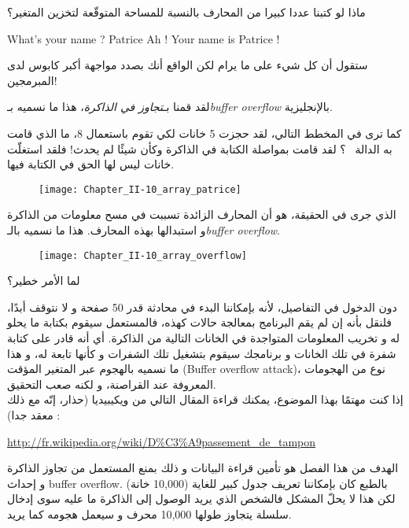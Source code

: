 ماذا لو كتبنا عددا كبيرا من المحارف بالنسبة للمساحة المتوقّعة لتخزين المتغير؟

\begin{Console}
What's your name ? Patrice
Ah ! Your name is Patrice !
\end{Console}

ستقول أن كل شيء على ما يرام لكن الواقع أنك بصدد مواجهة أكبر كابوس لدى المبرمجين!

لقد قمنا بـ\emph{تجاوز في الذاكرة}،
 هذا ما نسميه بـ\emph{\textenglish{buffer overflow}}
بالإنجليزية.

كما ترى في المخطط التالي، لقد حجزت 5 خانات لكي تقوم باستعمال 8، ما الذي قامت به الدالة
~؟
 لقد قامت بمواصلة الكتابة في الذاكرة وكأن شيئًا لم يحدث! فلقد استغلّت خانات ليس لها الحق في الكتابة فيها.

\begin{figure}[H]
	\centering
	\texttt{[image: Chapter\_II-10\_array\_patrice]}
\end{figure}

الذي جرى في الحقيقة، هو أن المحارف الزائدة تسببت في مسح معلومات من الذاكرة و استبدالها بهذه المحارف. هذا ما نسميه بالـ\emph{\textenglish{buffer overflow}}.

\begin{figure}[H]
	\centering
	\texttt{[image: Chapter\_II-10\_array\_overflow]}
\end{figure}

\begin{question}
  لما الأمر خطير؟
\end{question}

دون الدخول في التفاصيل، لأنه بإمكاننا البدء في محادثة  قدر 50 صفحة و لا نتوقف أبدًا، فلنقل بأنه إن لم يقم البرنامج بمعالجة حالات كهذه، فالمستعمل سيقوم بكتابة ما يحلو له و تخريب المعلومات المتواجدة في الخانات التالية من الذاكرة. أي أنه قادر على كتابة شفرة في تلك الخانات و برنامجك سيقوم بتشغيل تلك الشفرات و كأنها تابعة له، و هذا ما نسميه بالهجوم عبر المتغير المؤقت
(\textenglish{Buffer overflow attack})،
نوع من الهجومات المعروفة عند القراصنة، و لكنه صعب التحقيق.\\
إذا كنت مهتمًا بهذا الموضوع، يمكنك قراءة المقال التالي من ويكيبيديا (حذار، إنّه مع ذلك معقد جدا) :

\url{http://fr.wikipedia.org/wiki/D%C3%A9passement_de_tampon}

الهدف من هذا الفصل هو تأمين قراءة البيانات و ذلك بمنع المستعمل من تجاوز الذاكرة و إحداث
\textenglish{buffer overflow}.
بالطبع كان بإمكاننا تعريف جدول كبير للغاية (10,000 خانة) لكن هذا لا يحلّ المشكل فالشخص الذي يريد الوصول إلى الذاكرة ما عليه سوى إدخال سلسلة يتجاوز طولها 10,000 محرف و سيعمل هجومه كما يريد.

